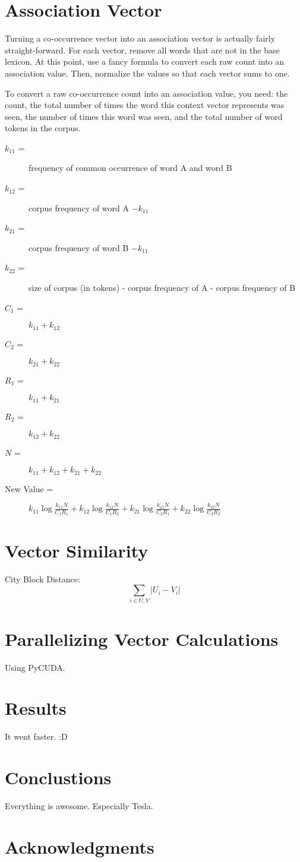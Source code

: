 \documentclass[12pt]{article}
\begin{document}
\section{Association Vector}

Turning a co-occurrence vector into an association vector is actually fairly
straight-forward. For each vector, remove all words that are not in the base
lexicon. At this point, use a fancy formula to convert each raw count into an
association value.  Then, normalize the values so that each vector sums to
one.

To convert a raw co-occurrence count into an association value, you need: the
count, the total number of times the word this context vector represents was
seen, the number of times this word was seen, and the total number of word
tokens in the corpus.

\begin{description}
\item[$k_{11}$ =] frequency of common occurrence of word A and word B
\item[$k_{12}$ =] corpus frequency of word A $- k_{11}$
\item[$k_{21}$ =] corpus frequency of word B $- k_{11}$
\item[$k_{22}$ =] size of corpus (in tokens) - corpus frequency of A - corpus frequency of B
\item[$C_1$ =] $k_{11} + k_{12}$
\item[$C_2$ =] $k_{21} + k_{22}$
\item[$R_1$ =] $k_{11} + k_{21}$
\item[$R_2$ =] $k_{12} + k_{22}$
\item[$N$ =] $k_{11} + k_{12} + k_{21} + k_{22}$
\item[New Value = ]
    $k_{11}\log\frac{k_{11}N}{C_1R_1} +
    k_{12}\log\frac{k_{12}N}{C_1R_2} +
    k_{21}\log\frac{k_{21}N}{C_2R_1} +
    k_{22}\log\frac{k_{22}N}{C_2R_2}$
\end{description}


\section{Vector Similarity}

City Block Distance:
$$\sum_{i\in U,V} |U_i - V_i| $$

\section{Parallelizing Vector Calculations}

Using PyCUDA.

\section{Results}

It went faster. :D

\section{Conclustions}
Everything is awesome. Especially Tesla.

\section{Acknowledgments}

\end{document}
